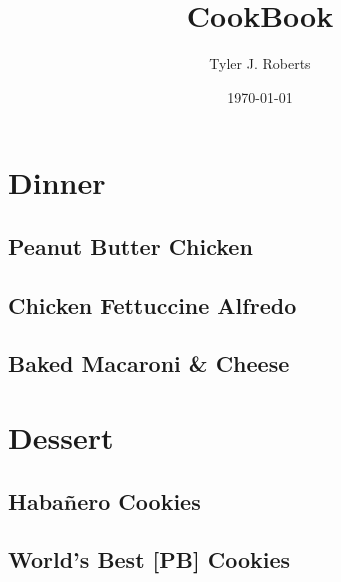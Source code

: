 \documentclass[a4paper,12pt]{article}
\author{Tyler J. Roberts}
\title{CookBook}
\date{\today}
\begin{document}
	\maketitle
	\newpage
	\tableofcontents
	\newpage
	\section{Dinner}
	\subsection{Peanut Butter Chicken}
	
	\newpage
	\subsection{Chicken Fettuccine Alfredo}
	
	\newpage
	\subsection{Baked Macaroni \& Cheese}
	
	\newpage
	\section{Dessert}
	\subsection{Haba{\~{n}}ero Cookies}
	
	\newpage
	\subsection{World's Best [PB] Cookies}
	
\end{document}
